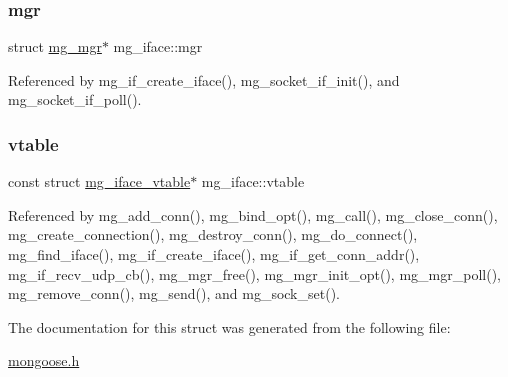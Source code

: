 \subsubsection{\texorpdfstring{mgr}{mgr}}
{\footnotesize\ttfamily struct \hyperlink{structmg__mgr}{mg\+\_\+mgr}$\ast$ mg\+\_\+iface\+::mgr}



Referenced by mg\+\_\+if\+\_\+create\+\_\+iface(), mg\+\_\+socket\+\_\+if\+\_\+init(), and mg\+\_\+socket\+\_\+if\+\_\+poll().

\mbox{\label{structmg__iface_ae02adab992b9704f4e61e937c505f336_ae02adab992b9704f4e61e937c505f336}} 
\subsubsection{\texorpdfstring{vtable}{vtable}}
{\footnotesize\ttfamily const struct \hyperlink{structmg__iface__vtable}{mg\+\_\+iface\+\_\+vtable}$\ast$ mg\+\_\+iface\+::vtable}



Referenced by mg\+\_\+add\+\_\+conn(), mg\+\_\+bind\+\_\+opt(), mg\+\_\+call(), mg\+\_\+close\+\_\+conn(), mg\+\_\+create\+\_\+connection(), mg\+\_\+destroy\+\_\+conn(), mg\+\_\+do\+\_\+connect(), mg\+\_\+find\+\_\+iface(), mg\+\_\+if\+\_\+create\+\_\+iface(), mg\+\_\+if\+\_\+get\+\_\+conn\+\_\+addr(), mg\+\_\+if\+\_\+recv\+\_\+udp\+\_\+cb(), mg\+\_\+mgr\+\_\+free(), mg\+\_\+mgr\+\_\+init\+\_\+opt(), mg\+\_\+mgr\+\_\+poll(), mg\+\_\+remove\+\_\+conn(), mg\+\_\+send(), and mg\+\_\+sock\+\_\+set().



The documentation for this struct was generated from the following file\+:\begin{DoxyCompactItemize}
\item 
\hyperlink{mongoose_8h}{mongoose.\+h}\end{DoxyCompactItemize}
